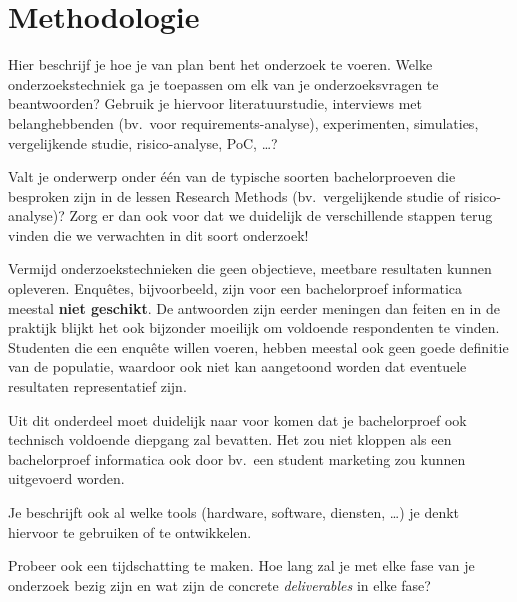 

\section{Methodologie}%
\label{sec:methodologie}

Hier beschrijf je hoe je van plan bent het onderzoek te voeren. Welke onderzoekstechniek ga je toepassen om elk van je onderzoeksvragen te beantwoorden? Gebruik je hiervoor literatuurstudie, interviews met belanghebbenden (bv.~voor requirements-analyse), experimenten, simulaties, vergelijkende studie, risico-analyse, PoC, \ldots?

Valt je onderwerp onder één van de typische soorten bachelorproeven die besproken zijn in de lessen Research Methods (bv.\ vergelijkende studie of risico-analyse)? Zorg er dan ook voor dat we duidelijk de verschillende stappen terug vinden die we verwachten in dit soort onderzoek!

Vermijd onderzoekstechnieken die geen objectieve, meetbare resultaten kunnen opleveren. Enquêtes, bijvoorbeeld, zijn voor een bachelorproef informatica meestal \textbf{niet geschikt}. De antwoorden zijn eerder meningen dan feiten en in de praktijk blijkt het ook bijzonder moeilijk om voldoende respondenten te vinden. Studenten die een enquête willen voeren, hebben meestal ook geen goede definitie van de populatie, waardoor ook niet kan aangetoond worden dat eventuele resultaten representatief zijn.

Uit dit onderdeel moet duidelijk naar voor komen dat je bachelorproef ook technisch voldoen\-de diepgang zal bevatten. Het zou niet kloppen als een bachelorproef informatica ook door bv.\ een student marketing zou kunnen uitgevoerd worden.

Je beschrijft ook al welke tools (hardware, software, diensten, \ldots) je denkt hiervoor te gebruiken of te ontwikkelen.

Probeer ook een tijdschatting te maken. Hoe lang zal je met elke fase van je onderzoek bezig zijn en wat zijn de concrete \emph{deliverables} in elke fase?

